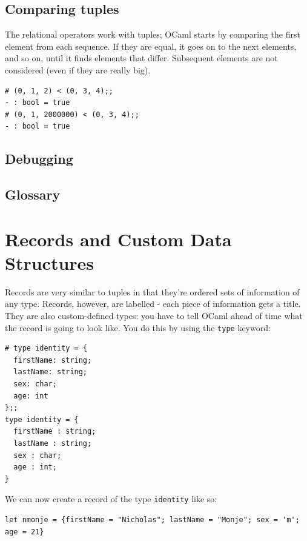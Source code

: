 \documentclass[10pt]{book}
\begin{document}
{\section{Comparing tuples}


The relational operators work with tuples;
OCaml starts by comparing the first element from each
sequence.  If they are equal, it goes on to the next elements,
and so on, until it finds elements that differ.  Subsequent
elements are not considered (even if they are really big).

\beforeverb
\begin{verbatim}
# (0, 1, 2) < (0, 3, 4);;
- : bool = true
# (0, 1, 2000000) < (0, 3, 4);;
- : bool = true
\end{verbatim}
\afterverb

\section{Debugging}

\section{Glossary}

\chapter{Records and Custom Data Structures}

Records are very similar to tuples in that they're ordered sets of information of any type. Records, however, are labelled - each piece of information gets a title. They are also custom-defined types: you have to tell OCaml ahead of time what the record is going to look like. You do this by using the {\tt type} keyword:

\beforeverb
\begin{verbatim}
# type identity = {
  firstName: string;
  lastName: string; 
  sex: char; 
  age: int
};;
type identity = {
  firstName : string;
  lastName : string;
  sex : char;
  age : int;
}
\end{verbatim}
\afterverb

We can now create a record of the type {\tt identity} like so:

\beforeverb
\begin{verbatim}
let nmonje = {firstName = "Nicholas"; lastName = "Monje"; sex = 'm'; age = 21}
\end{verbatim}
\afterverb
}
\end{document}

